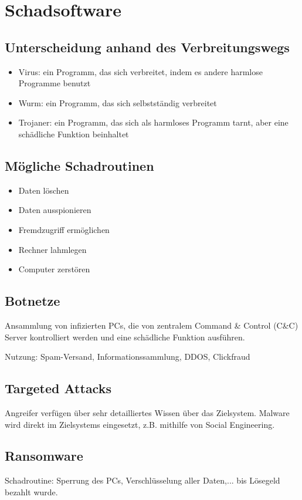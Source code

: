 \section{Schadsoftware}
\subsection{Unterscheidung anhand des Verbreitungswegs}
\begin{itemize}
    \item Virus: ein Programm, das sich verbreitet, indem es andere harmlose Programme benutzt
    \item Wurm: ein Programm, das sich selbstständig verbreitet
    \item Trojaner: ein Programm, das sich als harmloses Programm tarnt, aber eine schädliche Funktion beinhaltet
\end{itemize}

\subsection{Mögliche Schadroutinen}
\begin{itemize}
    \item Daten löschen
    \item Daten ausspionieren
    \item Fremdzugriff ermöglichen
    \item Rechner lahmlegen
    \item Computer zerstören
\end{itemize}

\subsection{Botnetze}
Ansammlung von infizierten PCs, die von zentralem Command \& Control (C\&C) Server kontrolliert werden 
und eine schädliche Funktion ausführen.

\vspace{.3cm}

Nutzung: Spam-Versand, Informationssammlung, DDOS, Clickfraud

\subsection{Targeted Attacks}
Angreifer verfügen über sehr detailliertes Wissen über das Zielsystem. Malware wird direkt im Zielsystems eingesetzt, z.B. mithilfe von Social Engineering.

\subsection{Ransomware}
Schadroutine: Sperrung des PCs, Verschlüsselung aller Daten,... bis Lösegeld bezahlt wurde.

